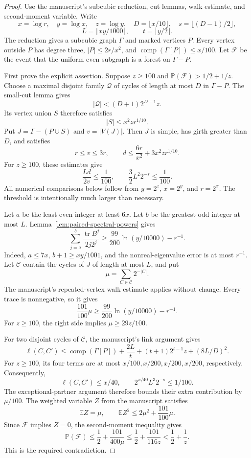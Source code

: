 \begin{proof}
Use the manuscript's subcubic reduction, cut lemmas, walk estimate, and second-moment variable.
Write
\[
 x=\log r,\quad y=\log x,\quad z=\log y,
 \quad D=\lfloor x/10\rfloor,\quad s=\lfloor(D-1)/2\rfloor,
\]
\[
 L=\lfloor xy/1000\rfloor,\qquad t=\lfloor y/2\rfloor.
\]
The reduction gives a subcubic graph $\Gamma$ and marked vertices $P$.
Every vertex outside $P$ has degree three, $|P|\le2r/x^2$, and
$\operatorname{comp}(\Gamma[P])\le x/100$.
Let $\mathcal F$ be the event that the uniform even subgraph is a forest on $\Gamma-P$.

First prove the explicit assertion.
Suppose $z\ge100$ and $\mathbb P(\mathcal F)>1/2+1/z$.
Choose a maximal disjoint family $\mathcal Q$ of cycles of length at most $D$ in $\Gamma-P$.
The small-cut lemma gives
\[
 |\mathcal Q|<(D+1)2^{D-1}z.
\]
Its vertex union $S$ therefore satisfies
\[
 |S|\le x^2z r^{1/10}.
\]
Put $J=\Gamma-(P\cup S)$ and $v=|V(J)|$.
Then $J$ is simple, has girth greater than $D$, and satisfies
\[
 r\le v\le3r,\qquad
 d\le\frac{6r}{x^2}+3x^2z r^{1/10}.
\]
For $z\ge100$, these estimates give
\[
 \frac{Ld}{2v}\le\frac1{100},\qquad
 \frac32 L^2 2^{-s}\le\frac1{100}.
\]
All numerical comparisons below follow from $y=2^z$, $x=2^y$, and $r=2^x$.
The threshold is intentionally much larger than necessary.

Let $a$ be the least even integer at least $6x$.
Let $b$ be the greatest odd integer at most $L$.
Lemma~\ref{lem:paired-spectral-powers} gives
\[
 \sum_{j=a}^b\frac{\operatorname{tr}B^j}{2j2^j}
 \ge\frac{99}{200}\ln(y/10000)-r^{-1}.
\]
Indeed, $a\le7x$, $b+1\ge xy/1001$, and the nonreal-eigenvalue error is at most $r^{-1}$.
Let $\mathcal C$ contain the cycles of $J$ of length at most $L$, and put
\[
 \mu=\sum_{C\in\mathcal C}2^{-|C|}.
\]
The manuscript's repeated-vertex walk estimate applies without change.
Every trace is nonnegative, so it gives
\[
 \frac{101}{100}\mu
 \ge\frac{99}{200}\ln(y/10000)-r^{-1}.
\]
For $z\ge100$, the right side implies $\mu\ge29z/100$.

For two disjoint cycles of $\mathcal C$, the manuscript's link argument gives
\[
 \ell(C,C')\le\operatorname{comp}(\Gamma[P])
  +\frac{2L}{t}+(t+1)2^{t-1}z+(8L/D)^2.
\]
For $z\ge100$, its four terms are at most $x/100,x/200,x/200,x/200$, respectively.
Consequently,
\[
 \ell(C,C')\le x/40,
 \qquad 2^{x/40}L^3 2^{-s}\le1/100.
\]
The exceptional-partner argument therefore bounds their extra contribution by $\mu/100$.
The weighted variable $Z$ from the manuscript satisfies
\[
 \mathbb EZ=\mu,\qquad
 \mathbb EZ^2\le2\mu^2+\frac{101}{100}\mu.
\]
Since $\mathcal F$ implies $Z=0$, the second-moment inequality gives
\[
 \mathbb P(\mathcal F)
 \le\frac12+\frac{101}{400\mu}
 \le\frac12+\frac{101}{116z}
 <\frac12+\frac1z.
\]
This is the required contradiction.


\end{proof}
